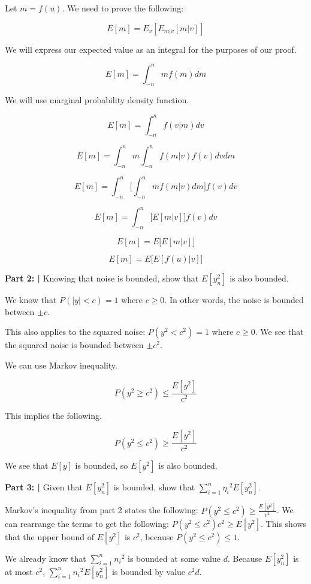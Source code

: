 \documentclass{article}
\begin{document}
 Let $m = f(u)$. We need to prove the following:
 
 \[E[m] = E_v[E_{m|v}[m|v]]\]
 
 We will express our expected value as an integral for the purposes of our proof.
 
 \[E[m] = \int_{-n}^{n}mf(m)dm\]
 
 We will use marginal probability density function.

 \[E[m]=\int_{-n}^{n}f(v|m)dv\]
 
 \[E[m]=\int_{-n}^{n}m\int_{-n}^{n}f(m|v)f(v)dvdm\]
 
 \[E[m]=\int_{-n}^{n}\Bigg[\int_{-n}^{n}mf(m|v)dm\Bigg]f(v)dv\]
 
 \[E[m]=\int_{-n}^{n}\Bigg[E[m|v]\Bigg]f(v)dv\]
 
 \[E[m]=E\big[E[m|v]\big]\]
 
 \[E[m]=E\big[E[f(u)|v]\big]\]
 
 \textbf{Part 2: | }Knowing that noise is bounded, show that $E[y_n^2]$ is also bounded.\newline
 
 We know that $P(|y|< c)=1$ where $c \geq 0$. In other words, the noise is bounded between $\pm c$.
 
 This also applies to the squared noise: $P(y^2 < c^2)=1$ where $c \geq 0$. We see that the squared noise is bounded between $\pm c^2$.
 
 We can use Markov inequality.
 
 \[P(y^2\geq c^2)\leq\frac{E[y^2]}{c^2}\]
 
 This implies the following.
 
 \[P(y^2\leq c^2)\geq\frac{E[y^2]}{c^2}\]
 
 We see that $E[y]$ is bounded, so $E[y^2]$ is also bounded.\newline
 
 \textbf{Part 3: | }Given that $E[y_n^2]$ is bounded, show that  $\sum_{i=1}^{n}{{\eta}_i}^2E[y_n^2]$.\newline
 
 Markov's inequality from part 2 states the following: $P(y^2\leq c^2)\geq\frac{E[y^2]}{c^2}$. We can rearrange the terms to get the following: $P(y^2\leq c^2)c^2\geq E[y^2]$. This shows that the upper bound of $E[y^2]$ is $c^2$, because $P(y^2\leq c^2) \leq 1$.
 
 We already know that $\sum_{i=1}^{n}{n_i}^2$ is bounded at some value $d$. Because $E[y_n^2]$ is at most $c^2$, $\sum_{i=1}^{n}{n_i}^2E[y_n^2]$ is bounded by value $c^2d$.\newline
 
\end{document}
